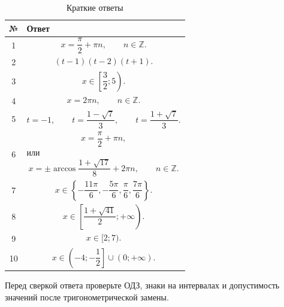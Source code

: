\documentclass[a4paper,12pt]{article}
\begin{document}
\renewcommand{\arraystretch}{1.35}

\begin{table}[ht]
\centering
\caption{Краткие ответы}
\begin{tabularx}{\linewidth}{@{}cX@{}}
\toprule
\textbf{№} & \textbf{Ответ} \\
\midrule

1 &
\[
x=\frac{\pi}{2}+\pi n,\qquad n\in\mathbb Z.
\]
\\

2 &
\[
(t-1)(t-2)(t+1).
\]
\\

3 &
\[
x\in\left[\frac32;5\right).
\]
\\

4 &
\[
x=2\pi n,\qquad n\in\mathbb Z.
\]
\\

5 &
\[
t=-1,\qquad
t=\frac{1-\sqrt7}{3},\qquad
t=\frac{1+\sqrt7}{3}.
\]
\\

6 &
\[
x=\frac{\pi}{2}+\pi n,
\]
или
\[
x=\pm\arccos\frac{1+\sqrt{17}}8+2\pi n,
\qquad n\in\mathbb Z.
\]
\\

7 &
\[
x\in
\left\{
-\frac{11\pi}{6},
-\frac{5\pi}{6},
\frac{\pi}{6},
\frac{7\pi}{6}
\right\}.
\]
\\

8 &
\[
x\in
\left[
\frac{1+\sqrt{41}}2;
+\infty
\right).
\]
\\

9 &
\[
x\in[2;7).
\]
\\

10 &
\[
x\in
\left(-4;-\frac12\right]
\cup
(0;+\infty).
\]
\\

\bottomrule
\end{tabularx}
\end{table}

\vfill

\begin{center}
\color{textgray}\small
Перед сверкой ответа проверьте ОДЗ, знаки на интервалах
и допустимость значений после тригонометрической замены.
\end{center}
\end{document}
